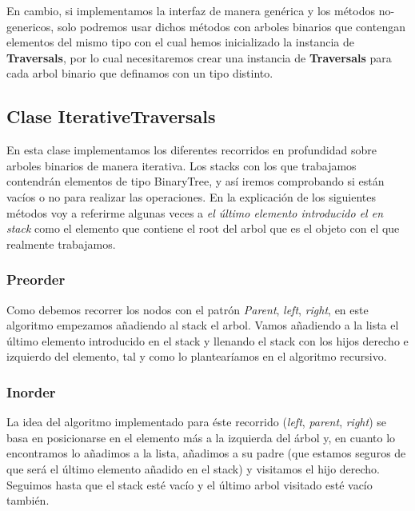 \documentclass{article}
\begin{document}
    En cambio, si implementamos la interfaz de manera genérica y los métodos no-genericos, solo podremos usar dichos métodos con arboles binarios que contengan elementos del mismo tipo con el cual hemos inicializado la instancia de \textbf{Traversals}, \newline por lo cual necesitaremos crear una instancia de \textbf{Traversals} para cada arbol binario que definamos con un tipo distinto.

    \subsection{Clase IterativeTraversals}
    En esta clase implementamos los diferentes recorridos en profundidad sobre arboles binarios de manera iterativa. \newline
    Los stacks con los que trabajamos contendrán elementos de tipo BinaryTree, y así iremos comprobando si están vacíos o no para realizar las operaciones.\newline
    En la explicación de los siguientes métodos voy a referirme algunas veces a \textit{el último elemento introducido el en stack} como el elemento que contiene el root del arbol que es el objeto con el que realmente trabajamos.

    \subsubsection{Preorder}
    Como debemos recorrer los nodos con el patrón \textit{Parent}, \textit{left}, \textit{right}, en este algoritmo empezamos añadiendo al stack el arbol.\newline
    Vamos añadiendo a la lista el último elemento introducido en el stack y llenando el stack con los hijos derecho e izquierdo del elemento, tal y como lo plantearíamos en el algoritmo recursivo.

    \subsubsection{Inorder}
    La idea del algoritmo implementado para éste recorrido (\textit{left}, \textit{parent}, \textit{right}) se basa en posicionarse en el elemento más a la izquierda del árbol y, en cuanto lo encontramos lo añadimos a la lista, añadimos a su padre (que estamos seguros de que será el último elemento añadido en el stack) y visitamos el hijo derecho. \newline
    Seguimos hasta que el stack esté vacío y el último arbol visitado esté vacío también.
\end{document}
